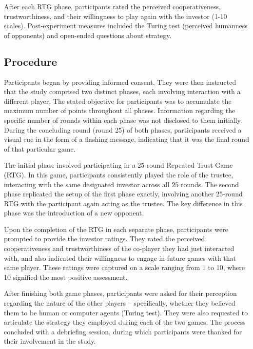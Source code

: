 \documentclass[
]{article}
\begin{document}
After each RTG phase, participants rated the perceived cooperativeness, trustworthiness, and their willingness to play again with the investor (1-10 scales). Post-experiment measures included the Turing test (perceived humanness of opponents) and open-ended questions about strategy.

\subsection{Procedure}\label{procedure}

Participants began by providing informed consent. They were then instructed that the study comprised two distinct phases, each involving interaction with a different player. The stated objective for participants was to accumulate the maximum number of points throughout all phases. Information regarding the specific number of rounds within each phase was not disclosed to them initially. During the concluding round (round 25) of both phases, participants received a visual cue in the form of a flashing message, indicating that it was the final round of that particular game.

The initial phase involved participating in a 25-round Repeated Trust Game (RTG). In this game, participants consistently played the role of the trustee, interacting with the same designated investor across all 25 rounds. The second phase replicated the setup of the first phase exactly, involving another 25-round RTG with the participant again acting as the trustee. The key difference in this phase was the introduction of a new opponent.

Upon the completion of the RTG in each separate phase, participants were prompted to provide the investor ratings. They rated the perceived cooperativeness and trustworthiness of the co-player they had just interacted with, and also indicated their willingness to engage in future games with that same player. These ratings were captured on a scale ranging from 1 to 10, where 10 signified the most positive assessment.

After finishing both game phases, participants were asked for their perception regarding the nature of the other players -- specifically, whether they believed them to be human or computer agents (Turing test). They were also requested to articulate the strategy they employed during each of the two games. The process concluded with a debriefing session, during which participants were thanked for their involvement in the study.
\end{document}
